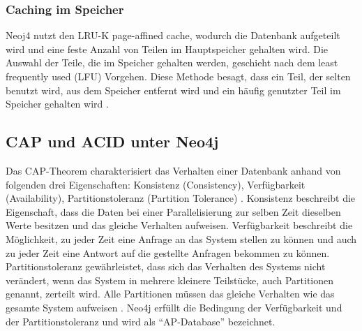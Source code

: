 \subsubsection{Caching im Speicher}
Neoj4 nutzt den LRU-K page-affined cache, wodurch die Datenbank aufgeteilt wird und eine feste Anzahl von Teilen im Hauptspeicher gehalten wird. Die Auswahl der Teile, die im Speicher gehalten werden, geschieht nach dem least frequently used (LFU) Vorgehen. Diese Methode besagt, dass ein Teil, der selten benutzt wird, aus dem Speicher entfernt wird und ein häufig genutzter Teil im Speicher gehalten wird \parencite{robinson2013graph}.
\subsection{CAP und ACID unter Neo4j}
Das CAP-Theorem charakterisiert das Verhalten einer Datenbank anhand von folgenden drei Eigenschaften: Konsistenz (Consistency), Verfügbarkeit (Availability), Partitionstoleranz (Partition Tolerance)  \parencite{simon2000brewer}. Konsistenz beschreibt die Eigenschaft, dass die Daten bei einer Parallelisierung zur selben Zeit dieselben Werte besitzen und das gleiche Verhalten aufweisen. Verfügbarkeit beschreibt die Möglichkeit, zu jeder Zeit eine Anfrage an das System stellen zu können und auch zu jeder Zeit eine Antwort auf die gestellte Anfragen bekommen zu können. Partitionstoleranz gewährleistet, dass sich das Verhalten des Systems nicht verändert, wenn das System in mehrere kleinere Teilstücke, auch  Partitionen genannt, zerteilt wird. Alle Partitionen müssen das gleiche Verhalten wie das gesamte System aufweisen \parencite{simon2000brewer}. Neo4j erfüllt die Bedingung der Verfügbarkeit und der  Partitionstoleranz \parencite{vukotic2015neo4j} und wird als “AP-Database” bezeichnet. \newline
